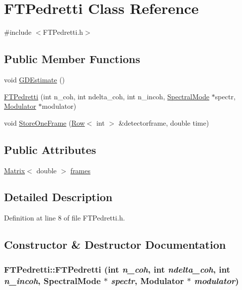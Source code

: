 \hypertarget{classFTPedretti}{
\section{FTPedretti Class Reference}
\label{classFTPedretti}
}


{\ttfamily \#include $<$FTPedretti.h$>$}

\subsection*{Public Member Functions}
\begin{DoxyCompactItemize}
\item 
void \hyperlink{classFTPedretti_aa5840df9985ff246fc42318c94c7779a}{GDEstimate} ()
\item 
\hyperlink{classFTPedretti_a8aa7bb8087a0e003f495e0ca98393867}{FTPedretti} (int n\_\-coh, int ndelta\_\-coh, int n\_\-incoh, \hyperlink{classSpectralMode}{SpectralMode} $\ast$spectr, \hyperlink{classModulator}{Modulator} $\ast$modulator)
\item 
void \hyperlink{classFTPedretti_a8d57325be576602b6f3eb56c2b4ef19d}{StoreOneFrame} (\hyperlink{classRow}{Row}$<$ int $>$ \&detectorframe, double time)
\end{DoxyCompactItemize}
\subsection*{Public Attributes}
\begin{DoxyCompactItemize}
\item 
\hyperlink{classMatrix}{Matrix}$<$ double $>$ \hyperlink{classFTPedretti_ae3c6c05c945c59fb8b3df83876faeab2}{frames}
\end{DoxyCompactItemize}


\subsection{Detailed Description}


Definition at line 8 of file FTPedretti.h.



\subsection{Constructor \& Destructor Documentation}
\hypertarget{classFTPedretti_a8aa7bb8087a0e003f495e0ca98393867}{
\subsubsection[{FTPedretti}]{\setlength{\rightskip}{0pt plus 5cm}FTPedretti::FTPedretti (int {\em n\_\-coh}, \/  int {\em ndelta\_\-coh}, \/  int {\em n\_\-incoh}, \/  {\bf SpectralMode} $\ast$ {\em spectr}, \/  {\bf Modulator} $\ast$ {\em modulator})}}
\label{classFTPedretti_a8aa7bb8087a0e003f495e0ca98393867}


